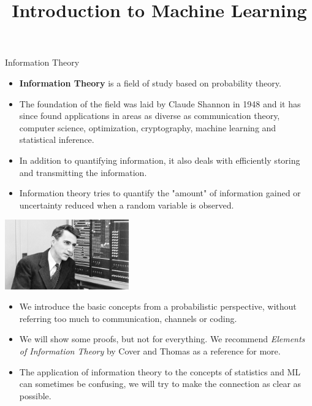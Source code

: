 \documentclass[11pt,compress,t,notes=noshow, xcolor=table]{beamer}
\title{Introduction to Machine Learning}
\date{}
\begin{document}


\begin{vbframe}{Information Theory}

\begin{itemize}
  \item \textbf{Information Theory} is a field of study based on probability theory.
  \item The foundation of the field was laid by Claude Shannon in 1948 and it has since found applications in areas as diverse as communication theory, computer science, optimization, cryptography, machine learning and statistical inference.
  \item In addition to quantifying information, it also deals with efficiently storing and transmitting the information.
  \item Information theory tries to quantify the "amount" of information gained or 
    uncertainty reduced when a random variable is observed.
\end{itemize}

  \begin{center}
\includegraphics[width = 0.4\textwidth]{figure_man/claude-shannon.jpg} \\
\end{center}

\framebreak

\begin{itemize}
  \item We introduce the basic concepts from a probabilistic perspective, without referring too much to communication, channels or coding.
  \item We will show some proofs, but not for everything. We recommend 
    \textit{Elements of Information Theory} by Cover and Thomas as a reference for more. 
  \item The application of information theory to the concepts of statistics and ML can sometimes be confusing, we will try to make the connection as clear as possible.
\end{itemize}
\end{vbframe}
\end{document}
